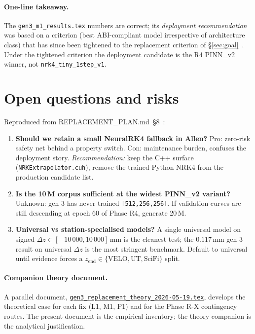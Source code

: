 \documentclass[11pt,a4paper]{article}
\begin{document}
\paragraph{One-line takeaway.} The \texttt{gen3\_m1\_results.tex}
numbers are correct; its \emph{deployment recommendation} was based
on a criterion (best ABI-compliant model irrespective of architecture
class) that has since been tightened to the replacement criterion of
\S\ref{sec:goal}~\cite{adr0009}. Under the tightened criterion the
deployment candidate is the R4 PINN\_v2 winner, not
\texttt{nrk4\_tiny\_1step\_v1}.

\section{Open questions and risks}\label{sec:risks}

Reproduced from REPLACEMENT\_PLAN.md~\S 8~\cite{replacementplan}:

\begin{enumerate}
\item \textbf{Should we retain a small NeuralRK4 fallback in Allen?}
      Pro: zero-risk safety net behind a property switch. Con:
      maintenance burden, confuses the deployment story.
      \emph{Recommendation:} keep the C++ surface
      (\texttt{NRKExtrapolator.cuh}), remove the trained Python NRK4
      from the production candidate list.
\item \textbf{Is the 10\,M corpus sufficient at the widest PINN\_v2
      variant?} Unknown: gen-3 has never trained
      \texttt{[512,256,256]}. If validation curves are still
      descending at epoch 60 of Phase R4, generate 20\,M.
\item \textbf{Universal vs station-specialised models?} A single
      universal model on signed $\Delta z \in [-10\,000, 10\,000]$\,mm
      is the cleanest test; the $0.117$\,mm gen-3 result on
      universal $\Delta z$ is the most stringent benchmark. Default
      to universal until evidence forces a $z_{\mathrm{end}} \in
      \{\text{VELO}, \text{UT}, \text{SciFi}\}$ split.
\end{enumerate}

\paragraph{Companion theory document.} A parallel document,
\href{run:gen3_replacement_theory_2026-05-19.tex}{\texttt{gen3\_replacement\_theory\_2026-05-19.tex}},
develops the theoretical case for each fix (L1, M1, P1) and for the
Phase R-X contingency routes. The present document is the empirical
inventory; the theory companion is the analytical justification.
\end{document}
